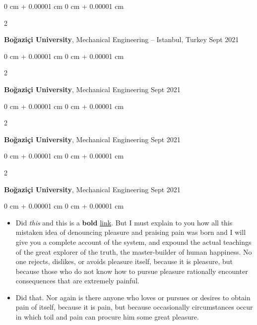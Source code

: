 \documentclass[10pt, letterpaper]{article}
\newenvironment{highlights}{
    \begin{itemize}[
        topsep=0.10 cm,
        parsep=0.10 cm,
        partopsep=0pt,
        itemsep=0pt,
        leftmargin=0 cm + 10pt
    ]
}{
    \end{itemize}
} %
\newenvironment{onecolentry}{
    \begin{adjustwidth}{
        0 cm + 0.00001 cm
    }{
        0 cm + 0.00001 cm
    }
}{
    \end{adjustwidth}
} %
\newenvironment{twocolentry}[2][]{
    \onecolentry
    \def\secondColumn{#2}
    \setcolumnwidth{\fill, 4.5 cm}
    \begin{paracol}{2}
}{
    \switchcolumn \raggedleft \secondColumn
    \end{paracol}
    \endonecolentry
} %
\begin{document}
        \vspace{0.2 cm}

        \begin{twocolentry}{
            Sept 2021
        }
            \textbf{Boğaziçi University}, Mechanical Engineering -- Istanbul, Turkey\end{twocolentry}



        \vspace{0.2 cm}

        \begin{twocolentry}{
            Sept 2021
        }
            \textbf{Boğaziçi University}, Mechanical Engineering\end{twocolentry}



        \vspace{0.2 cm}

        \begin{twocolentry}{
            Sept 2021
        }
            \textbf{Boğaziçi University}, Mechanical Engineering\end{twocolentry}



        \vspace{0.2 cm}

        \begin{twocolentry}{
            Sept 2021
        }
            \textbf{Boğaziçi University}, Mechanical Engineering\end{twocolentry}

        \vspace{0.10 cm}
        \begin{onecolentry}
            \begin{highlights}
                \item Did \textit{this} and this is a \textbf{bold} \href{https://example.com}{link}. But I must explain to you how all this mistaken idea of denouncing pleasure and praising pain was born and I will give you a complete account of the system, and expound the actual teachings of the great explorer of the truth, the master-builder of human happiness. No one rejects, dislikes, or avoids pleasure itself, because it is pleasure, but because those who do not know how to pursue pleasure rationally encounter consequences that are extremely painful.
                \item Did that. Nor again is there anyone who loves or pursues or desires to obtain pain of itself, because it is pain, but because occasionally circumstances occur in which toil and pain can procure him some great pleasure.
            \end{highlights}
        \end{onecolentry}
\end{document}
